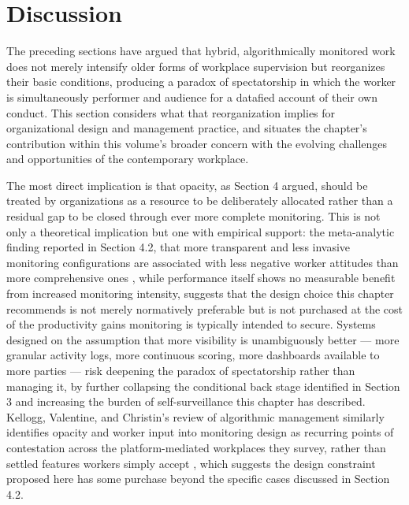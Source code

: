 \documentclass[10pt]{article}
\begin{document}
\section{Discussion}

The preceding sections have argued that hybrid, algorithmically monitored work does not merely intensify older forms of workplace supervision but reorganizes their basic conditions, producing a paradox of spectatorship in which the worker is simultaneously performer and audience for a datafied account of their own conduct. This section considers what that reorganization implies for organizational design and management practice, and situates the chapter's contribution within this volume's broader concern with the evolving challenges and opportunities of the contemporary workplace.

The most direct implication is that opacity, as Section 4 argued, should be treated by organizations as a resource to be deliberately allocated rather than a residual gap to be closed through ever more complete monitoring. This is not only a theoretical implication but one with empirical support: the meta-analytic finding reported in Section 4.2, that more transparent and less invasive monitoring configurations are associated with less negative worker attitudes than more comprehensive ones \cite{ravid2023}, while performance itself shows no measurable benefit from increased monitoring intensity, suggests that the design choice this chapter recommends is not merely normatively preferable but is not purchased at the cost of the productivity gains monitoring is typically intended to secure. Systems designed on the assumption that more visibility is unambiguously better --- more granular activity logs, more continuous scoring, more dashboards available to more parties --- risk deepening the paradox of spectatorship rather than managing it, by further collapsing the conditional back stage identified in Section 3 and increasing the burden of self-surveillance this chapter has described. Kellogg, Valentine, and Christin's review of algorithmic management similarly identifies opacity and worker input into monitoring design as recurring points of contestation across the platform-mediated workplaces they survey, rather than settled features workers simply accept \cite{kellogg2020}, which suggests the design constraint proposed here has some purchase beyond the specific cases discussed in Section 4.2.
\end{document}
